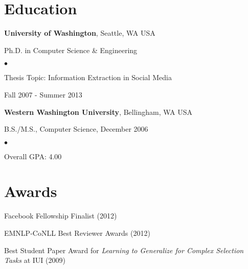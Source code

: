 \documentclass[margin,line]{res}
\newenvironment{list1}{
  \begin{list}{\ding{113}}{%
      \setlength{\itemsep}{0in}
      \setlength{\parsep}{0in} \setlength{\parskip}{0in}
      \setlength{\topsep}{0in} \setlength{\partopsep}{0in} 
      \setlength{\leftmargin}{0.17in}}}{\end{list}}
\newenvironment{list2}{
  \begin{list}{$\bullet$}{%
      \setlength{\itemsep}{0in}
      \setlength{\parsep}{0in} \setlength{\parskip}{0in}
      \setlength{\topsep}{0in} \setlength{\partopsep}{0in} 
      \setlength{\leftmargin}{0.2in}}}{\end{list}}
\begin{document}
\begin{resume}
\section{\sc Education}
{\bf University of Washington}, Seattle, WA USA\\
\vspace*{-.1in}
\begin{list1}
\item[] Ph.D. in Computer Science \& Engineering
\begin{list2}
\vspace*{.05in}
\item Thesis Topic: Information Extraction in Social Media
\item Fall 2007 - Summer 2013
\end{list2}
\end{list1}
{\bf Western Washington University}, Bellingham, WA USA\\
\vspace*{-.1in}
\begin{list1}
\item[] B.S./M.S., Computer Science,  December 2006
  \begin{list2}
    \vspace*{.05in}
    \item Overall GPA: 4.00
  \end{list2}
\end{list1}




\section{\sc Awards}

Facebook Fellowship Finalist (2012)
\vspace*{-2.5mm}

EMNLP-CoNLL Best Reviewer Awards (2012)
\vspace*{-2.5mm}

Best Student Paper Award for \emph{Learning to Generalize for Complex Selection Tasks} at IUI (2009)
\vspace*{-2.5mm}


\end{resume}
\end{document}
